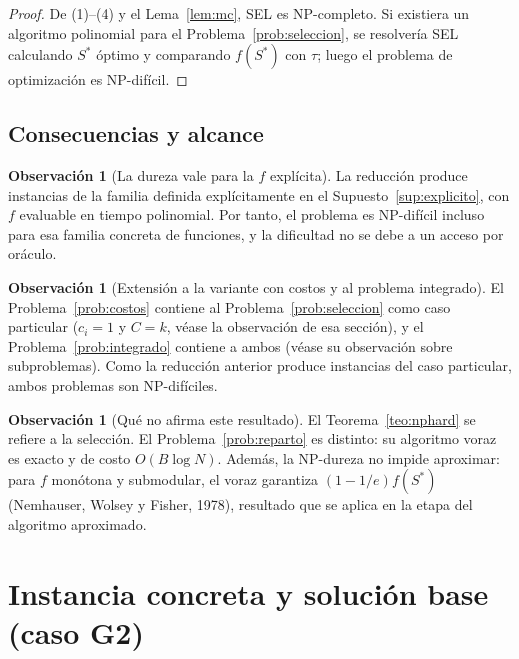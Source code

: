 \documentclass[11pt,a4paper]{article}
\theoremstyle{definition}
\newtheorem{observacion}[definicion]{Observación}
\theoremstyle{plain}
\begin{document}
\begin{proof}
De (1)--(4) y el Lema~\ref{lem:mc}, \textsc{SEL} es NP-completo. Si existiera un
algoritmo polinomial para el Problema~\ref{prob:seleccion}, se resolvería
\textsc{SEL} calculando $S^\ast$ óptimo y comparando $f(S^\ast)$ con $\tau$; luego
el problema de optimización es NP-difícil.
\end{proof}

\subsection{Consecuencias y alcance}

\begin{observacion}[La dureza vale para la $f$ explícita]
La reducción produce instancias de la familia definida explícitamente en el
Supuesto~\ref{sup:explicito}, con $f$ evaluable en tiempo polinomial. Por tanto,
el problema es NP-difícil incluso para esa familia concreta de funciones, y la
dificultad no se debe a un acceso por oráculo.
\end{observacion}

\begin{observacion}[Extensión a la variante con costos y al problema integrado]
El Problema~\ref{prob:costos} contiene al Problema~\ref{prob:seleccion} como
caso particular ($c_i=1$ y $C=k$, véase la observación de esa sección), y el
Problema~\ref{prob:integrado} contiene a ambos (véase su observación sobre
subproblemas). Como la reducción anterior produce instancias del caso
particular, ambos problemas son NP-difíciles.
\end{observacion}

\begin{observacion}[Qué no afirma este resultado]
El Teorema~\ref{teo:nphard} se refiere a la selección. El
Problema~\ref{prob:reparto} es distinto: su algoritmo voraz es exacto y de
costo $O(B\log N)$. Además, la NP-dureza no impide aproximar: para $f$ monótona
y submodular, el voraz garantiza $(1-1/e)f(S^\ast)$ (Nemhauser, Wolsey y
Fisher, 1978), resultado que se aplica en la etapa del algoritmo aproximado.
\end{observacion}

\section{Instancia concreta y solución base (caso G2)}
\end{document}
